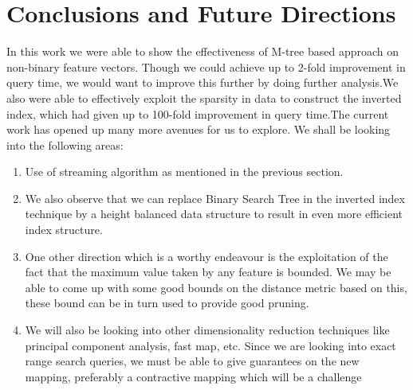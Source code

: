 
\section{Conclusions and Future Directions}

In this work we were able to show the effectiveness of M-tree based approach on non-binary feature vectors. Though we could achieve up to 2-fold improvement in query time, we would want to improve this further by doing further analysis.We also were able to effectively exploit the sparsity in data to construct the inverted index, which had given up to 100-fold improvement in query time.The current work has opened up many more avenues for us to explore. We shall be looking into the following areas:\\
\begin{enumerate}
\item Use of streaming algorithm as mentioned in the previous section. 
\item We also observe that we can replace Binary Search Tree in the inverted index technique by a height balanced data structure to result in even more efficient index structure. 
\item One other direction which is a worthy endeavour is the exploitation of the fact that the maximum value taken by any feature is bounded. We may be able to come up with some good bounds on the distance metric based on this, these bound can be in turn used to provide good pruning.  
\item We will also be looking into other dimensionality reduction techniques like principal component analysis, fast map, etc. Since we are looking into exact range search queries, we must be able to give guarantees on the new mapping, preferably a contractive mapping which will be a challenge \\
\end{enumerate}
 